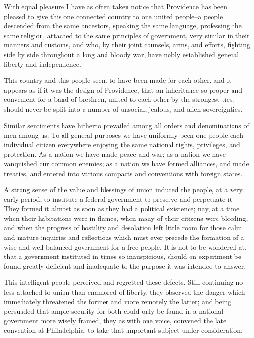 With equal pleasure I have as often taken notice that Providence has been pleased to give this one connected country to one united people--a people descended from the same ancestors, speaking the same language, professing the same religion, attached to the same principles of government, very similar in their manners and customs, and who, by their joint counsels, arms, and efforts, fighting side by side throughout a long and bloody war, have nobly established general liberty and independence.

This country and this people seem to have been made for each other, and it appears as if it was the design of Providence, that an inheritance so proper and convenient for a band of brethren, united to each other by the strongest ties, should never be split into a number of unsocial, jealous, and alien sovereignties.

Similar sentiments have hitherto prevailed among all orders and denominations of men among us. To all general purposes we have uniformly been one people each individual citizen everywhere enjoying the same national rights, privileges, and protection. As a nation we have made peace and war; as a nation we have vanquished our common enemies; as a nation we have formed alliances, and made treaties, and entered into various compacts and conventions with foreign states.

A strong sense of the value and blessings of union induced the people, at a very early period, to institute a federal government to preserve and perpetuate it. They formed it almost as soon as they had a political existence; nay, at a time when their habitations were in flames, when many of their citizens were bleeding, and when the progress of hostility and desolation left little room for those calm and mature inquiries and reflections which must ever precede the formation of a wise and well-balanced government for a free people. It is not to be wondered at, that a government instituted in times so inauspicious, should on experiment be found greatly deficient and inadequate to the purpose it was intended to answer.

This intelligent people perceived and regretted these defects. Still continuing no less attached to union than enamored of liberty, they observed the danger which immediately threatened the former and more remotely the latter; and being persuaded that ample security for both could only be found in a national government more wisely framed, they as with one voice, convened the late convention at Philadelphia, to take that important subject under consideration.

